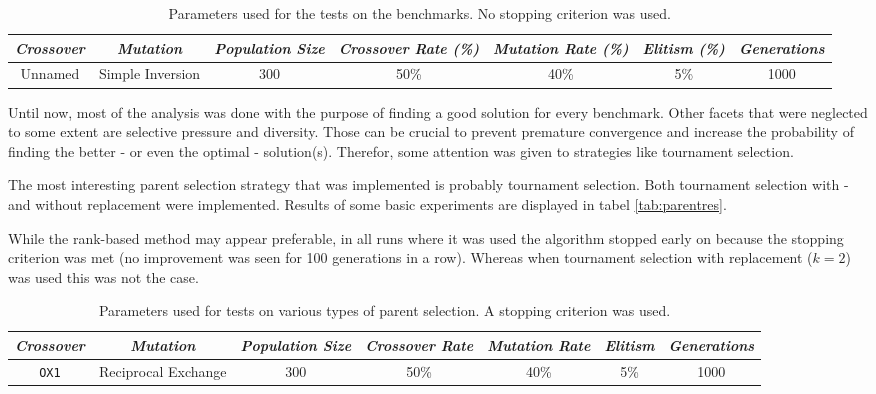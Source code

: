 \begin{table}[h]
\centering
\footnotesize
\begin{tabular}{c|c|c|c|c|c|c}
\textit{Crossover} & \textit{Mutation} & \textit{Population Size} & \textit{Crossover Rate (\%)} & \textit{Mutation Rate (\%)} & \textit{Elitism (\%)} & \textit{Generations} \\\hline 
Unnamed & Simple Inversion & 300 & 50\% & 40\% & 5\% & 1000
\end{tabular}
\caption{Parameters used for the tests on the benchmarks. No stopping criterion was used.}
\label{tab:bench1}
\end{table}


Until now, most of the analysis was done with the purpose of finding a good solution for every benchmark. Other facets that were neglected to some extent are selective pressure and diversity. Those can be crucial to prevent premature convergence and increase the probability of finding the better - or even the optimal - solution(s). Therefor, some attention was given to strategies like tournament selection.


The most interesting parent selection strategy that was implemented is probably tournament selection. Both tournament selection with - and without replacement were implemented. Results of some basic experiments are displayed in tabel \ref{tab:parentres}.\\

\par\noindent While the rank-based method may appear preferable, in all runs where it was used the algorithm stopped early on because the stopping criterion was met (no improvement was seen for 100 generations in a row). Whereas when tournament selection with replacement ($k=2$) was used this was not the case.

\begin{table}[h]
\centering
\footnotesize
\begin{tabular}{c|c|c|c|c|c|c}
\textit{Crossover} & \textit{Mutation} & \textit{Population Size} & \textit{Crossover Rate} & \textit{Mutation Rate} & \textit{Elitism} & \textit{Generations} \\\hline 
\texttt{OX1} & Reciprocal Exchange & 300 & 50\% & 40\% & 5\% & 1000
\end{tabular}
\caption{Parameters used for tests on various types of parent selection. A stopping criterion was used.}
\label{tab:parent}
\end{table}

